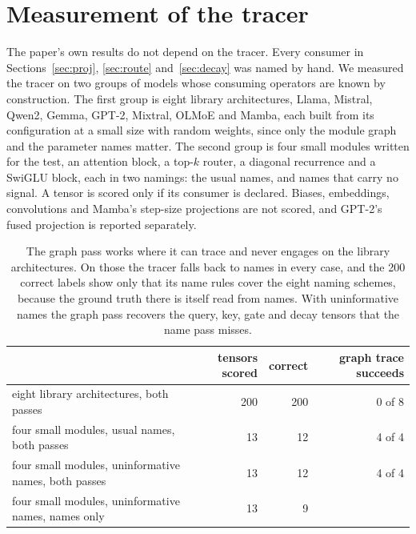 \documentclass[10pt]{article}
\begin{document}



\appendix

\section{Measurement of the tracer}\label{app:tracer}

The paper's own results do not depend on the tracer. Every consumer in
Sections~\ref{sec:proj}, \ref{sec:route} and~\ref{sec:decay} was named by hand. We measured the tracer on two groups
of models whose consuming operators are known by construction. The first group is eight library
architectures, Llama, Mistral, Qwen2, Gemma, GPT-2, Mixtral, OLMoE and Mamba, each built from its
configuration at a small size with random weights, since only the module graph and the parameter
names matter. The second group is four small modules written for the test, an attention block, a
top-$k$ router, a diagonal recurrence and a SwiGLU block, each in two namings: the usual names,
and names that carry no signal. A tensor is scored only if its consumer is declared. Biases,
embeddings, convolutions and Mamba's step-size projections are not scored, and GPT-2's fused
projection is reported separately.

\begin{table}[h]
\centering
\small
\begin{tabular}{lrrr}
\toprule
 & tensors scored & correct & graph trace succeeds \\
\midrule
eight library architectures, both passes & 200 & 200 & 0 of 8 \\
four small modules, usual names, both passes & 13 & 12 & 4 of 4 \\
four small modules, uninformative names, both passes & 13 & 12 & 4 of 4 \\
four small modules, uninformative names, names only & 13 & 9 & \\
\bottomrule
\end{tabular}
\caption{The graph pass works where it can trace and never engages on the library
architectures. On those the tracer falls back to names in every case, and the 200 correct labels
show only that its name rules cover the eight naming schemes, because the ground truth there is
itself read from names. With uninformative names the graph pass recovers the query, key, gate and
decay tensors that the name pass misses.}
\label{tab:tracer}
\end{table}
\end{document}
